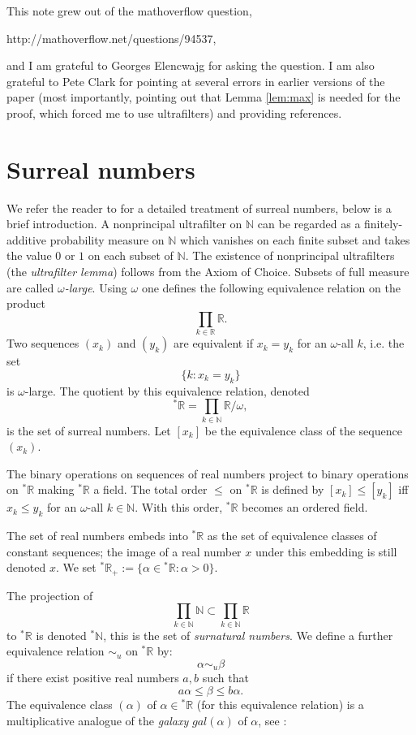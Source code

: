 \documentclass{amsproc}
\theoremstyle{definition}
\theoremstyle{definition}
\theoremstyle{remark}
\begin{document}
\medskip
{} This note grew out of the mathoverflow question, 

 http://mathoverflow.net/questions/94537, 

\noindent and I am grateful to Georges Elencwajg for asking the question. I am also grateful to Pete Clark for pointing at several errors in earlier versions of the paper (most importantly, pointing out that Lemma \ref{lem:max} is needed for the proof, which forced me to use ultrafilters) and providing references. 

\section{Surreal numbers}
 
We refer the reader to \cite{Goldblatt} for a detailed treatment of surreal numbers, below is a brief introduction. 
A nonprincipal ultrafilter on ${{\mathbb N}}$ can be regarded as a finitely-additive probability measure on ${{\mathbb N}}$ which vanishes on each finite subset and takes  the value $0$ or $1$ on each subset of ${{\mathbb N}}$. The existence of nonprincipal ultrafilters (the {\em ultrafilter lemma}) follows from the Axiom of Choice. Subsets of full measure are called {\em ${\omega}$-large}. Using ${\omega}$ one defines the following equivalence relation on the product 
$$
\prod_{k\in {{\mathbb R}}} {{\mathbb R}}. 
$$
Two sequences $(x_k)$ and $(y_k)$ are equivalent if $x_k=y_k$ for an ${\omega}$-all $k$, i.e. the set 
$$
\{k: x_k=y_k\}
$$ 
is ${\omega}$-large. The quotient by this equivalence relation, denoted  
$$
{{}^{*}{{\mathbb R}}}=  \prod_{k\in {{\mathbb N}}} {{\mathbb R}}/{\omega}, 
$$
is the set of surreal numbers. Let $[x_k]$ be the equivalence class of the sequence $(x_k)$. 

The binary operations on sequences of real numbers project to binary operations on ${{}^{*}{{\mathbb R}}}$ making ${{}^{*}{{\mathbb R}}}$ a field. The total order  $\le$ on ${{}^{*}{{\mathbb R}}}$ is defined by $[x_k]\le [y_k]$ iff $x_k\le y_k$ for an ${\omega}$-all $k\in {{\mathbb N}}$. With this order, ${{}^{*}{{\mathbb R}}}$ becomes an ordered field.  

The set of real numbers embeds into ${{}^{*}{{\mathbb R}}}$ as the set of equivalence classes of constant sequences; the image of a real number $x$ under this embedding is still denoted $x$. We set ${{}^{*}{{\mathbb R}}}_+:=\{{\alpha}\in {{}^{*}{{\mathbb R}}}: {\alpha}>0\}$. 

The projection of
$$
\prod_{k\in {{\mathbb N}}} {{\mathbb N}}  \subset \prod_{k\in {{\mathbb N}}} {{\mathbb R}}
$$
to ${{}^{*}{{\mathbb R}}}$ is denoted ${{}^{*}{{\mathbb N}}}$, this is the set of {\em surnatural numbers}. We define a further equivalence relation $\sim_u$ on 
${{}^{*}{{\mathbb R}}}$ by:
$$
{\alpha}\sim_u {\beta}
$$
if there exist positive real numbers $a, b$ such that
$$
a{\alpha} \le {\beta} \le b {\alpha}. 
$$
The equivalence class $({\alpha})$ of ${\alpha}\in {{}^{*}{{\mathbb R}}}$ (for this equivalence relation) is a multiplicative analogue of the {\em galaxy} $gal({\alpha})$ of ${\alpha}$, see   \cite{Goldblatt}:
\end{document}
